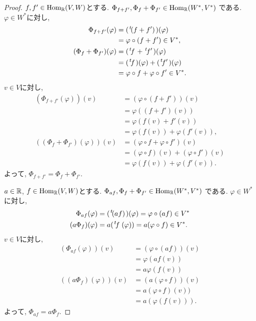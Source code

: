 \begin{proof}
  $f,f'\in \operatorname{Hom}_{\mathbb{R}}(V,W)$とする.
  $\Phi_{f+f'},\Phi_{f}+\Phi_{f'}\in\operatorname{Hom}_{\mathbb{R}}(W^\ast,V^\ast)$
  である.
  $\varphi\in W^\ast$に対し,
  \begin{align*}
    \Phi_{f+f'}(\varphi)
    &=(\left.^{t}\!(f+f')\right.)(\varphi)\\
    &=\varphi\circ(f+f')\in V^\ast,\\
    (\Phi_{f}+\Phi_{f'})(\varphi)
    &=(\left.^{t}\!f\right.+\left.^{t}\!f'\right.)(\varphi)\\
    &=(\left.^{t}\!f\right.)(\varphi)+(\left.^{t}\!f'\right.)(\varphi)\\
    &=\varphi\circ f+\varphi\circ f'\in V^\ast.
  \end{align*}
  $v\in V$に対し,
  \begin{align*}
    (\Phi_{f+f'}(\varphi))(v)
    &=(\varphi\circ(f+f'))(v)\\
    &=\varphi((f+f')(v))\\
    &=\varphi(f(v)+f'(v))\\
    &=\varphi(f(v))+\varphi(f'(v)),\\
    ((\Phi_{f}+\Phi_{f'})(\varphi))(v)
    &=(\varphi\circ f+\varphi\circ f')(v)\\
    &=(\varphi\circ f)(v)+(\varphi\circ f')(v)\\
    &=\varphi(f(v))+\varphi(f'(v)).
  \end{align*}
  よって, $\Phi_{f+f'}=\Phi_{f}+\Phi_{f'}$.
 
  $a\in\mathbb{R}$,
  $f\in \operatorname{Hom}_{\mathbb{R}}(V,W)$とする.
  $\Phi_{af},\Phi_{f}+\Phi_{f'}\in\operatorname{Hom}_{\mathbb{R}}(W^\ast,V^\ast)$
  である.
  $\varphi\in W^\ast$に対し,
  \begin{align*}
    \Phi_{af}(\varphi)&=(\left.^{t}\!(a f)\right.)(\varphi)=\varphi\circ(af)\in V^\ast\\
    (a\Phi_{f})(\varphi)&=a(\left.^{t}\!f\right.(\varphi))=a(\varphi\circ f)\in V^\ast.
  \end{align*}
  $v\in V$に対し,
  \begin{align*}
    (\Phi_{af}(\varphi))(v)
    &=(\varphi\circ(af)) (v)\\
    &=\varphi(af(v))\\
    &=a\varphi(f(v))\\
    ((a\Phi_{f})(\varphi))(v)
    &=(a(\varphi\circ f))(v)\\
    &=a(\varphi\circ f)(v))\\
    &=a(\varphi(f(v))).
  \end{align*}
  よって, $\Phi_{af}=a\Phi_{f}$.
\end{proof}


